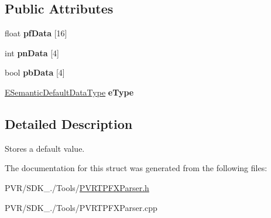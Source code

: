 \subsection*{Public Attributes}
\begin{DoxyCompactItemize}
\item 
\hypertarget{struct_s_p_v_r_t_semantic_default_data_a31392a0c80c4e356f4781cb53a9729a8}{float {\bfseries pf\+Data} \mbox{[}16\mbox{]}}\label{struct_s_p_v_r_t_semantic_default_data_a31392a0c80c4e356f4781cb53a9729a8}

\item 
\hypertarget{struct_s_p_v_r_t_semantic_default_data_a17198051d6da15e6551e923d001c1639}{int {\bfseries pn\+Data} \mbox{[}4\mbox{]}}\label{struct_s_p_v_r_t_semantic_default_data_a17198051d6da15e6551e923d001c1639}

\item 
\hypertarget{struct_s_p_v_r_t_semantic_default_data_af26a6a04c1c74d601faeb1c9574d64f0}{bool {\bfseries pb\+Data} \mbox{[}4\mbox{]}}\label{struct_s_p_v_r_t_semantic_default_data_af26a6a04c1c74d601faeb1c9574d64f0}

\item 
\hypertarget{struct_s_p_v_r_t_semantic_default_data_ae6c13f133faa01e90bfcede35c21fe63}{\hyperlink{_p_v_r_t_p_f_x_parser_8h_a8027993149213b0ea29b036f584e213f}{E\+Semantic\+Default\+Data\+Type} {\bfseries e\+Type}}\label{struct_s_p_v_r_t_semantic_default_data_ae6c13f133faa01e90bfcede35c21fe63}

\end{DoxyCompactItemize}


\subsection{Detailed Description}
Stores a default value. 



 

The documentation for this struct was generated from the following files\+:\begin{DoxyCompactItemize}
\item 
P\+V\+R/\+S\+D\+K\+\_./\+Tools/\hyperlink{_p_v_r_t_p_f_x_parser_8h}{P\+V\+R\+T\+P\+F\+X\+Parser.\+h}\item 
P\+V\+R/\+S\+D\+K\+\_./\+Tools/P\+V\+R\+T\+P\+F\+X\+Parser.\+cpp\end{DoxyCompactItemize}
